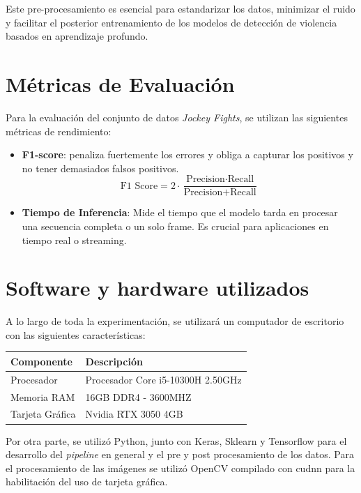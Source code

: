 Este pre-procesamiento es esencial para estandarizar 
los datos, minimizar el ruido y facilitar el posterior 
entrenamiento de los modelos de detección de violencia basados 
en aprendizaje profundo.

\section{Métricas de Evaluación}

Para la evaluación del conjunto de datos 
\textit{Jockey Fights}, se utilizan las siguientes 
métricas de rendimiento:

\begin{itemize}

    \item \textbf{F1-score}: penaliza fuertemente los errores 
    y obliga a capturar los positivos y no tener demasiados 
    falsos positivos.
    \begin{equation}
        \text{F1 Score} = 2 \cdot \frac{\text{Precision} \cdot \text{Recall}}{\text{Precision} + \text{Recall}}
    \end{equation}

    \item \textbf{Tiempo de Inferencia}: Mide el tiempo que 
    el modelo tarda en procesar una secuencia completa o un 
    solo frame. Es crucial para aplicaciones en tiempo real 
    o streaming.

\end{itemize}

\section{Software y hardware utilizados}
A lo largo de toda la experimentación, se utilizará un computador de escritorio con las siguientes características:

\begin{table}[h!]
\centering
\footnotesize
\begin{tabular}{|l|l|}
\hline
\textbf{Componente} & \textbf{Descripción} \\ \hline
Procesador & Procesador	Core i5-10300H 2.50GHz\\ \hline
Memoria RAM & 16GB DDR4 - 3600MHZ \\ \hline
Tarjeta Gráfica & Nvidia RTX 3050 4GB \\ \hline
\end{tabular}
\end{table}

Por otra parte, se utilizó Python, junto con Keras, Sklearn y Tensorflow 
para el desarrollo del \textit{pipeline} en general y el pre y post 
procesamiento de los datos. Para el procesamiento de las imágenes 
se utilizó OpenCV compilado con cudnn para la habilitación 
del uso de tarjeta gráfica. 

